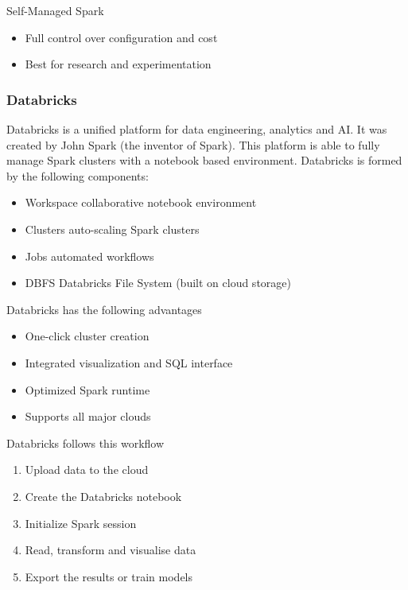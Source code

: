 \vspace{10pt}

Self-Managed Spark

\begin{itemize}
    \item Full control over configuration and cost
    \item Best for research and experimentation
\end{itemize}

\subsubsection{Databricks}

Databricks is a unified platform for data engineering, analytics and AI. It was created by John Spark (the inventor of Spark). This platform is able to fully manage Spark clusters with a notebook based environment. Databricks is formed by the following components:

\begin{itemize}
    \item Workspace \ra collaborative notebook environment
    \item Clusters \ra auto-scaling Spark clusters
    \item Jobs \ra automated workflows
    \item DBFS \ra Databricks File System (built on cloud storage)
\end{itemize}

Databricks has the following advantages

\begin{itemize}
    \item One-click cluster creation
    \item Integrated visualization and SQL interface
    \item Optimized Spark runtime
    \item Supports all major clouds
\end{itemize}

Databricks follows this workflow
\begin{enumerate}
    \item Upload data to the cloud
    \item Create the Databricks notebook
    \item Initialize Spark session
    \item Read, transform and visualise data
    \item Export the results or train models
\end{enumerate}

